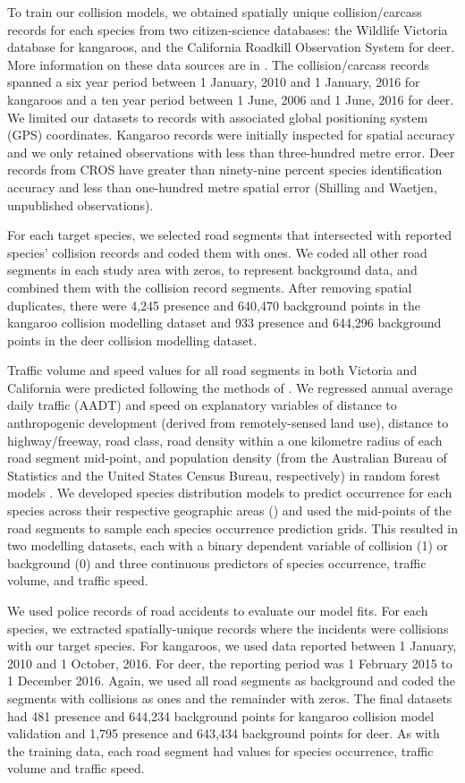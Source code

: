 To train our collision models, we obtained spatially unique collision/carcass records for each species from two citizen-science databases: the Wildlife Victoria database for kangaroos, and the California Roadkill Observation System \citep[CROS, see][]{shil15a} for deer. More information on these data sources are in . The collision/carcass records spanned a six year period between 1 January, 2010 and 1 January, 2016 for kangaroos and a ten year period between 1 June, 2006 and 1 June, 2016 for deer. We limited our datasets to records with associated global positioning system (GPS) coordinates. Kangaroo records were initially inspected for spatial accuracy and we only retained observations with less than three-hundred metre error. Deer records from CROS have greater than ninety-nine percent species identification accuracy and less than one-hundred metre spatial error (Shilling and Waetjen, unpublished observations).

For each target species, we selected road segments that intersected with reported species' collision records and coded them with ones. We coded all other road segments in each study area with zeros, to represent background data, and combined them with the collision record segments.  After removing spatial duplicates, there were 4,245 presence and 640,470 background points in the kangaroo collision modelling dataset and 933 presence and 644,296 background points in the deer collision modelling dataset.

Traffic volume and speed values for all road segments in both Victoria and California were predicted following the methods of .  We regressed annual average daily traffic (AADT) and speed on explanatory variables of distance to anthropogenic development (derived from remotely-sensed land use), distance to highway/freeway, road class, road density within a one kilometre radius of each road segment mid-point, and population density (from the Australian Bureau of Statistics and the United States Census Bureau, respectively) in random forest models \citep[see][]{brei01}. We developed species distribution models to predict occurrence for each species across their respective geographic areas () and used the mid-points of the road segments to sample each species occurrence prediction grids. This resulted in two modelling datasets, each with a binary dependent variable of collision (1) or background (0) and three continuous predictors of species occurrence, traffic volume, and traffic speed.  

We used police records of road accidents to evaluate our model fits.  For each species, we extracted spatially-unique records where the incidents were collisions with our target species.  For kangaroos, we used data reported between 1 January, 2010 and 1 October, 2016. For deer, the reporting period was 1 February 2015 to 1 December 2016.  Again, we used all road segments as background and coded the segments with collisions as ones and the remainder with zeros. The final datasets had 481 presence and 644,234 background points for kangaroo collision model validation and 1,795 presence and 643,434 background points for deer. As with the training data, each road segment had values for species occurrence, traffic volume and traffic speed.


